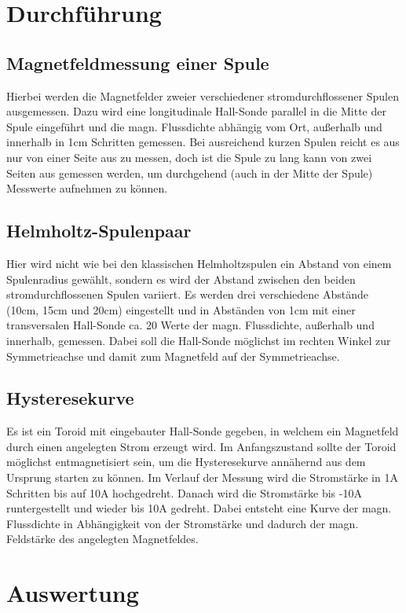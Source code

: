 \documentclass[titlepage = firstcover]{scrartcl}
\begin{document}
    \section{Durchführung}
      \subsection{Magnetfeldmessung einer Spule}
        Hierbei werden die Magnetfelder zweier verschiedener stromdurchflossener Spulen ausgemessen. Dazu wird eine longitudinale Hall-Sonde parallel in die
        Mitte der Spule eingeführt und die magn. Flussdichte abhängig vom Ort, außerhalb und innerhalb in 1cm Schritten gemessen. Bei ausreichend kurzen Spulen reicht es aus nur von einer Seite aus
        zu messen, doch ist die Spule zu lang kann von zwei Seiten aus gemessen werden, um durchgehend (auch in der Mitte der Spule) Messwerte aufnehmen zu
        können.
      \subsection{Helmholtz-Spulenpaar}
        Hier wird nicht wie bei den klassischen Helmholtzspulen ein Abstand von einem Spulenradius gewählt, sondern es wird der Abstand zwischen den beiden
        stromdurchflossenen Spulen variiert. Es werden drei verschiedene Abstände (10cm, 15cm und 20cm) eingestellt und in Abständen von 1cm mit einer transversalen Hall-Sonde
        ca. 20 Werte der magn. Flussdichte, außerhalb und innerhalb, gemessen. Dabei soll die Hall-Sonde möglichst im rechten Winkel zur Symmetrieachse und
        damit zum Magnetfeld auf der Symmetrieachse.
      \subsection{Hysteresekurve}
        Es ist ein Toroid mit eingebauter Hall-Sonde gegeben, in welchem ein Magnetfeld durch einen angelegten Strom erzeugt wird. Im Anfangszustand sollte
        der Toroid möglichst entmagnetisiert sein, um die Hysteresekurve annähernd aus dem Ursprung starten zu können. Im Verlauf der Messung wird die
        Stromstärke in 1A Schritten bis auf 10A hochgedreht. Danach wird die Stromstärke bis -10A runtergestellt und wieder bis 10A gedreht.
        Dabei entsteht eine Kurve der magn. Flussdichte in Abhängigkeit von der Stromstärke und dadurch der magn. Feldstärke des angelegten Magnetfeldes.

        \section{Auswertung}
\end{document}
